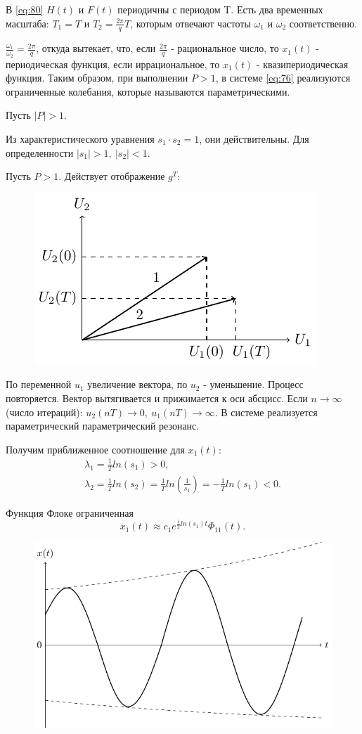 В \eqref{eq:80} $H(t)$ и $F(t)$ периодичны с периодом T. Есть два временных масштаба: $T_1=T$ и $T_2=\frac{2\pi}{q}T$, которым отвечают частоты $\omega_1$ и $\omega_2$ соответственно.

$\frac{\omega_1}{\omega_2}=\frac{2\pi}{q}$, откуда вытекает, что, если $\frac{2\pi}{q}$ - рациональное число, то $x_1(t)$ - периодическая функция, если иррациональное, то $x_1(t)$ - квазипериодическая функция. Таким образом, при выполнении $P>1$, в системе \eqref{eq:76} реализуются ограниченные колебания, которые называются параметрическими.

Пусть $|P|>1$.

Из характеристического уравнения $s_1 \cdot s_2=1$, они действительны. Для определенности $|s_1|>1,~ |s_2|<1$.

Пусть $P>1$. Действует отображение $g^T$:
\begin{figure}[H]
	\centering
	\includegraphics[width=0.35\linewidth]{fig/fig41.pdf}   
\end{figure}

По переменной $u_1$ увеличение вектора, по $u_2$ - уменьшение. Процесс повторяется. Вектор вытягивается и прижимается к оси абсцисс. Если $n\rightarrow \infty$ (число итераций): $u_2(nT)\rightarrow 0,~u_1(nT)\rightarrow \infty$. В системе реализуется параметрический параметрический резонанс. 

Получим приближенное соотношение для $x_1(t)$:
\begin{gather*}
	\lambda_1=\frac{1}{T}ln(s_1)>0, \\
	\lambda_2=\frac{1}{T}ln(s_2)=\frac{1}{T}ln(\frac{1}{s_1})=-\frac{1}{T}ln(s_1)<0.
\end{gather*}

Функция Флоке ограниченная
\begin{equation*}
	x_1(t)\approx c_1 e^{\frac{1}{T}ln(s_1)t}\Phi_{11}(t).
\end{equation*}
\begin{figure}[H]
	\centering
	\includegraphics[width=0.5\linewidth]{fig/fig42.pdf}   
\end{figure}

